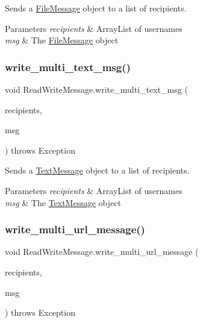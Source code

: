 Sends a \hyperlink{class_file_message}{File\+Message} object to a list of recipients. 


\begin{DoxyParams}{Parameters}
{\em recipients} & Array\+List of usernames \\
\hline
{\em msg} & The \hyperlink{class_file_message}{File\+Message} object \\
\hline
\end{DoxyParams}
\mbox{\label{class_read_write_message_a2a509bda22a84d2b46949c71984d205c}} 
\subsubsection{\texorpdfstring{write\+\_\+multi\+\_\+text\+\_\+msg()}{write\_multi\_text\_msg()}}
{\footnotesize\ttfamily void Read\+Write\+Message.\+write\+\_\+multi\+\_\+text\+\_\+msg (\begin{DoxyParamCaption}\item[{Array\+List$<$ String $>$}]{recipients,  }\item[{\hyperlink{class_text_message}{Text\+Message}}]{msg }\end{DoxyParamCaption}) throws Exception}



Sends a \hyperlink{class_text_message}{Text\+Message} object to a list of recipients. 


\begin{DoxyParams}{Parameters}
{\em recipients} & Array\+List of usernames \\
\hline
{\em msg} & The \hyperlink{class_text_message}{Text\+Message} object \\
\hline
\end{DoxyParams}
\mbox{\label{class_read_write_message_a9a005ffe1f6fd45a7490890e199731d5}} 
\subsubsection{\texorpdfstring{write\+\_\+multi\+\_\+url\+\_\+message()}{write\_multi\_url\_message()}}
{\footnotesize\ttfamily void Read\+Write\+Message.\+write\+\_\+multi\+\_\+url\+\_\+message (\begin{DoxyParamCaption}\item[{Array\+List$<$ String $>$}]{recipients,  }\item[{\hyperlink{class_u_r_l_message}{U\+R\+L\+Message}}]{msg }\end{DoxyParamCaption}) throws Exception}



